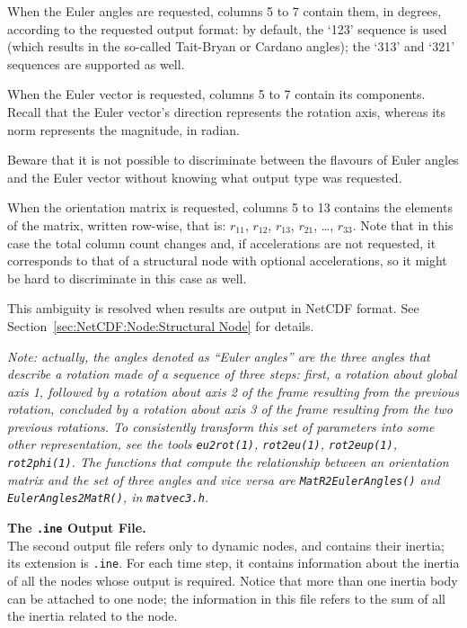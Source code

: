 When the Euler angles are requested, columns 5 to 7 contain
them, in degrees, according to the requested output format:
by default, the `123' sequence is used (which results in the so-called Tait-Bryan or Cardano angles);
the `313' and `321' sequences are supported as well.

When the Euler vector is requested, columns 5 to 7 contain
its components.  Recall that the Euler vector's direction represents the rotation axis,
whereas its norm represents the magnitude, in radian.

Beware that it is not possible to discriminate between
the flavours of Euler angles and the Euler vector without knowing
what output type was requested.

When the orientation matrix is requested, columns 5 to 13
contains the elements of the matrix, written row-wise,
that is: $r_{11}$, $r_{12}$, $r_{13}$, $r_{21}$, \ldots, $r_{33}$.
Note that in this case the total column count changes and, if accelerations
are not requested, it corresponds to that of a structural node
with optional accelerations, so it might be hard to discriminate in this case
as well.

This ambiguity is resolved when results are output in NetCDF format.
See Section~\ref{sec:NetCDF:Node:Structural Node} for details.

\emph{Note: actually, the angles denoted as ``Euler angles'' 
are the three angles that describe a rotation made of a sequence
of three steps: first, a rotation about global axis 1,
followed by a rotation about axis 2 of the frame resulting from
the previous rotation, concluded by a rotation about axis 3
of the frame resulting from the two previous rotations.
To consistently transform this set of parameters into some other
representation, see the tools
\texttt{eu2rot(1)}, \texttt{rot2eu(1)}, \texttt{rot2eup(1)}, \texttt{rot2phi(1)}.
The functions that compute the relationship between an orientation
matrix and the set of three angles and vice versa are
\texttt{MatR2EulerAngles()} and \texttt{EulerAngles2MatR()}, in \texttt{matvec3.h}.
}

\textbf{The \texttt{.ine} Output File.} \\
The second output file refers only to dynamic nodes, and contains their
inertia; its extension is \texttt{.ine}.
For each time step, it contains information about the inertia of all the
nodes whose output is required.
Notice that more than one inertia body can be attached to one node; the
information in this file refers to the sum of all the inertia related to
the node.

